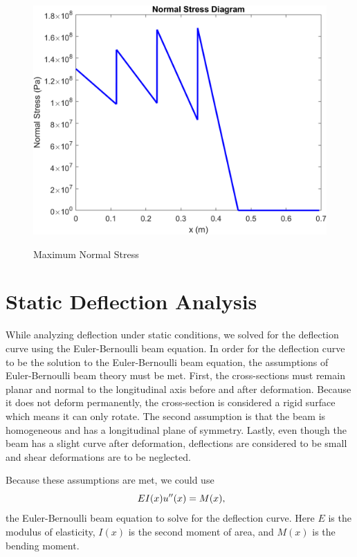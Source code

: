 \documentclass[12pt]{article}
\begin{document}
\begin{figure}[H]
\centering
\includegraphics[height= 9.5cm, width= 12.5cm]{curve_Normal_Stress.png}
\caption{Maximum Normal Stress}
\label{MaximumNormalStress}
\end{figure}
\newpage

\section{Static Deflection Analysis}
While analyzing deflection under static conditions, we solved for the deflection curve using the Euler-Bernoulli beam equation. In order for the deflection curve to be the solution to the Euler-Bernoulli beam equation, the assumptions of Euler-Bernoulli beam theory must be met. First, the cross-sections must remain planar and normal to the longitudinal axis before and after deformation. Because it does not deform permanently, the cross-section is considered a rigid surface which means it can only rotate. The second assumption is that the beam is homogeneous and has a longitudinal plane of symmetry. Lastly, even though the beam has a slight curve after deformation, deflections are considered to be small and shear deformations are to be neglected.
\setlength{\parindent}{0cm}

Because these assumptions are met, we could use
\begin{equation}
    \centering
    \ EI(x)u''(x) = M(x),
\end{equation}
the Euler-Bernoulli beam equation to solve for the deflection curve. Here $E$ is the modulus of elasticity, $I(x)$ is the second moment of area, and $M(x)$ is the bending moment.
\end{document}
